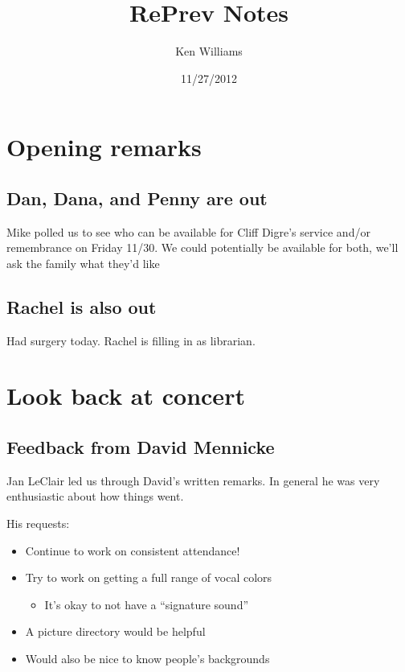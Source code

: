 \documentclass[11pt]{article}
\title{RePrev Notes}
\author{Ken Williams}
\date{11/27/2012}
\begin{document}
\maketitle

\setcounter{tocdepth}{3}
\tableofcontents
\vspace*{1cm}

\section{Opening remarks}
\label{sec-1}
\subsection{Dan, Dana, and Penny are out}
\label{sec-1-1}


Mike polled us to see who can be available for Cliff Digre's service
and/or remembrance on Friday 11/30.  We could potentially be available
for both, we'll ask the family what they'd like
\subsection{Rachel is also out}
\label{sec-1-2}


Had surgery today.  Rachel is filling in as librarian.
\section{Look back at concert}
\label{sec-2}
\subsection{Feedback from David Mennicke}
\label{sec-2-1}


Jan LeClair led us through David's written remarks.  In general he was
very enthusiastic about how things went.

His requests:

\begin{itemize}
\item Continue to work on consistent attendance!
\item Try to work on getting a full range of vocal colors
\begin{itemize}
\item It's okay to not have a ``signature sound''
\end{itemize}
\item A picture directory would be helpful
\item Would also be nice to know people's backgrounds
\end{itemize}
\end{document}
